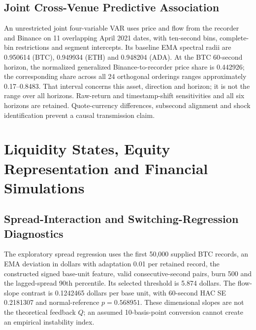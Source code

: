 \documentclass[12pt]{article}
\theoremstyle{definition}
\theoremstyle{remark}
\begin{document}
\subsection{Joint Cross-Venue Predictive Association}
\label{sec:cross_venue_verified}
An unrestricted joint four-variable VAR uses price and flow from the recorder and Binance on 11 overlapping April 2021 dates, with ten-second bins, complete-bin restrictions and segment intercepts. Its baseline EMA spectral radii are 0.950614 (BTC), 0.949934 (ETH) and 0.948204 (ADA). At the BTC 60-second horizon, the normalized generalized Binance-to-recorder price share is 0.442926; the corresponding share across all 24 orthogonal orderings ranges approximately 0.17--0.8483. That interval concerns this asset, direction and horizon; it is not the range over all horizons. Raw-return and timestamp-shift sensitivities and all six horizons are retained. Quote-currency differences, subsecond alignment and shock identification prevent a causal transmission claim.

\section{Liquidity States, Equity Representation and Financial Simulations}
\label{sec:stress_fragility}
\subsection{Spread-Interaction and Switching-Regression Diagnostics}
The exploratory spread regression uses the first 50,000 supplied BTC records, an EMA deviation in dollars with adaptation 0.01 per retained record, the constructed signed base-unit feature, valid consecutive-second pairs, burn 500 and the lagged-spread 90th percentile. Its selected threshold is 5.874 dollars. The flow-slope contrast is 0.1242465 dollars per base unit, with 60-second HAC SE 0.2181307 and normal-reference $p=0.568951$. These dimensional slopes are not the theoretical feedback $Q$; an assumed 10-basis-point conversion cannot create an empirical instability index.
\begin{table}[htbp]
\centering\footnotesize\setlength{\tabcolsep}{3pt}
\caption{Exploratory BTC spread-interaction regression on the first 50,000 supplied records, with 49,497 valid transitions after burn and gap filtering. Flow is a constructed signed base-unit feature; the slope has dollars per base unit and is not the dimensionless $Q$.}
\label{tab:threshold_var}
\end{table}
\end{document}
